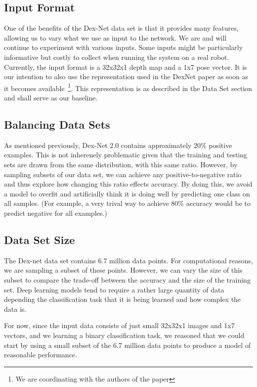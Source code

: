 \documentclass[letterpaper, 10 pt, conference]{../ieeeconf}
\begin{document}
\subsection{Input Format}
One of the benefits of the Dex-Net data set is that it provides many features, allowing us to vary what we use as input to the network. 
We are and will continue to experiment with various inputs. 
Some inputs might be particularly informative but costly to collect when running the system on a real robot. 
Currently, the input format is a 32x32x1 depth map and a 1x7 pose vector. 
It is our intention to also use the representation used in the DexNet paper as soon as it becomes available~\footnote{We are coordinating with the authors of the paper}.
This representation is as described in the Data Set section and shall serve as our baseline. 

\subsection{Balancing Data Sets}
As mentioned previously, Dex-Net 2.0 contains approximately 20\% positive examples. 
This is not inherenely problematic given that the training and testing sets are drawn from the same distribution, with this same ratio.
However, by sampling subsets of our data set, we can achieve any positive-to-negative ratio and thus explore how changing this ratio effects accuracy. 
By doing this, we avoid a model to overfit and artificially think it is doing well by predicting one class on all samples.
(For example, a very trival way to achieve 80\% accuracy would be to predict negative for all examples.)

\subsection{Data Set Size}
The Dex-net data set contains 6.7 million data points. 
For computational reasons, we are sampling a subset of these points. 
However, we can vary the size of this subset to compare the trade-off between the accuracy and the size of the training set. 
Deep learning models tend to require a rather large quantity of data depending the classification task that it is being learned and how complex the data is.

For now, since the input data consists of just small 32x32x1 images and 1x7 vectors, and we learning a binary classification task, we reasoned that we could start by using a small subset of the 6.7 million data points to produce a model of reasonable performance.
\end{document}
